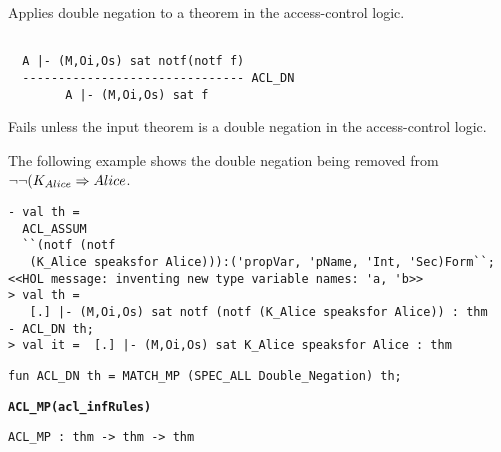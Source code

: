 \SYNOPSIS
Applies double negation to a theorem in the access-control logic.

\DESCRIPTION
\begin{verbatim}

  A |- (M,Oi,Os) sat notf(notf f)
  ------------------------------- ACL_DN
        A |- (M,Oi,Os) sat f
\end{verbatim}

\FAILURE
Fails unless the input theorem is a double negation in the
access-control logic.

\EXAMPLE The following example shows the double negation being removed
from $\neg\neg(K_{Alice} \Rightarrow Alice$.
\begin{holboxed}
\begin{verbatim}
- val th = 
  ACL_ASSUM 
  ``(notf (notf 
   (K_Alice speaksfor Alice))):('propVar, 'pName, 'Int, 'Sec)Form``;
<<HOL message: inventing new type variable names: 'a, 'b>>
> val th =  
   [.] |- (M,Oi,Os) sat notf (notf (K_Alice speaksfor Alice)) : thm
- ACL_DN th;
> val it =  [.] |- (M,Oi,Os) sat K_Alice speaksfor Alice : thm
\end{verbatim}
\end{holboxed}

\IMPLEMENTATION
\begin{holboxed}
\begin{verbatim}
fun ACL_DN th = MATCH_MP (SPEC_ALL Double_Negation) th;
\end{verbatim}
\end{holboxed}


  


\begin{holboxed}
  \begin{Large}
    \textbf{\texttt{ACL\_MP}}\hfill{}\textbf{\texttt{(acl\_infRules)}}
  \end{Large}
\end{holboxed}
\begin{verbatim}
ACL_MP : thm -> thm -> thm
\end{verbatim}

